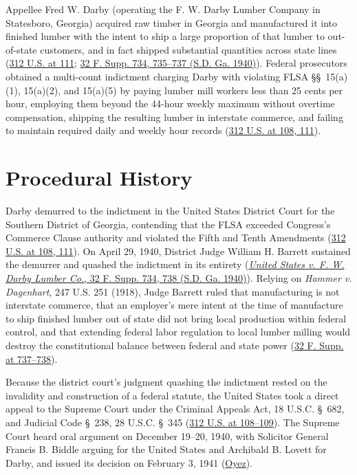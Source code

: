 \documentclass[12pt]{article}
\begin{document}
Appellee Fred W. Darby (operating the F. W. Darby Lumber Company in Statesboro, Georgia) acquired raw timber in Georgia and manufactured it into finished lumber with the intent to ship a large proportion of that lumber to out-of-state customers, and in fact shipped substantial quantities across state lines (\href{https://supreme.justia.com/cases/federal/us/312/100/}{312 U.S. at 111}; \href{https://law.justia.com/cases/federal/district-courts/FSupp/32/734/2245495/}{32 F. Supp. 734, 735--737 (S.D. Ga. 1940)}). Federal prosecutors obtained a multi-count indictment charging Darby with violating FLSA \S\S~15(a)(1), 15(a)(2), and 15(a)(5) by paying lumber mill workers less than 25 cents per hour, employing them beyond the 44-hour weekly maximum without overtime compensation, shipping the resulting lumber in interstate commerce, and failing to maintain required daily and weekly hour records (\href{https://supreme.justia.com/cases/federal/us/312/100/}{312 U.S. at 108, 111}).

\section{Procedural History}

Darby demurred to the indictment in the United States District Court for the Southern District of Georgia, contending that the FLSA exceeded Congress's Commerce Clause authority and violated the Fifth and Tenth Amendments (\href{https://supreme.justia.com/cases/federal/us/312/100/}{312 U.S. at 108, 111}). On April 29, 1940, District Judge William H. Barrett sustained the demurrer and quashed the indictment in its entirety (\href{https://law.justia.com/cases/federal/district-courts/FSupp/32/734/2245495/}{\textit{United States v. F. W. Darby Lumber Co.}, 32 F. Supp. 734, 738 (S.D. Ga. 1940)}). Relying on \textit{Hammer v. Dagenhart}, 247 U.S. 251 (1918), Judge Barrett ruled that manufacturing is not interstate commerce, that an employer's mere intent at the time of manufacture to ship finished lumber out of state did not bring local production within federal control, and that extending federal labor regulation to local lumber milling would destroy the constitutional balance between federal and state power (\href{https://law.justia.com/cases/federal/district-courts/FSupp/32/734/2245495/}{32 F. Supp. at 737--738}).

Because the district court's judgment quashing the indictment rested on the invalidity and construction of a federal statute, the United States took a direct appeal to the Supreme Court under the Criminal Appeals Act, 18 U.S.C. \S~682, and Judicial Code \S~238, 28 U.S.C. \S~345 (\href{https://supreme.justia.com/cases/federal/us/312/100/}{312 U.S. at 108--109}). The Supreme Court heard oral argument on December 19--20, 1940, with Solicitor General Francis B. Biddle arguing for the United States and Archibald B. Lovett for Darby, and issued its decision on February 3, 1941 (\href{https://www.oyez.org/cases/1940-1955/312us100}{Oyez}).
\end{document}
